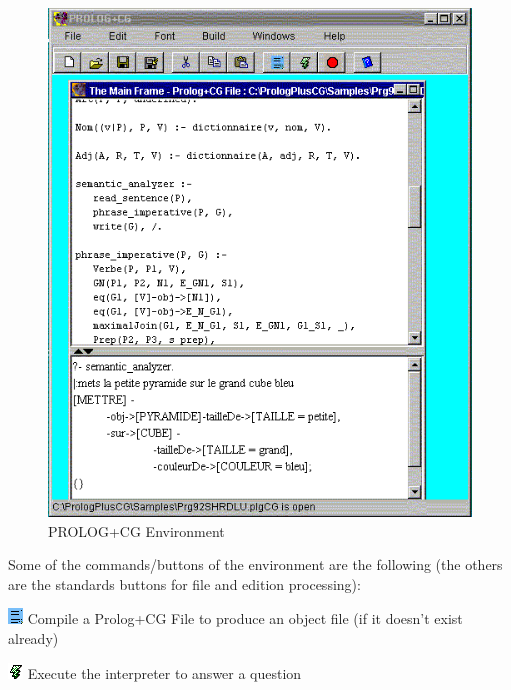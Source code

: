 \documentclass{book}
\begin{document}
\begin{htmlonly}

\begin{figure}
\begin{center}
\includegraphics{snapshot1.png}
\end{center}
\caption{\label{PrologPlusCGEnvironment}PROLOG+CG Environment}
\end{figure}

\end{htmlonly}




Some of the commands/buttons of the environment are the following (the
others are the standards buttons for file and edition processing):

\includegraphics{compile.png} Compile a Prolog+CG File to produce an
object file (if it doesn't exist already)

\includegraphics{shortcut.png} Execute the interpreter to answer a
question
\end{document}
